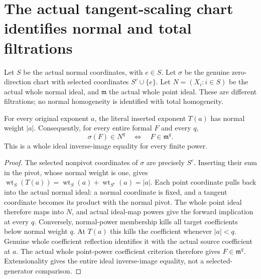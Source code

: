 \section{The actual tangent-scaling chart identifies normal and total filtrations}

Let $S$ be the actual normal coordinates, with $e\in S$. Let $\sigma$ be
the genuine zero-direction chart with selected coordinates $S^c\cup\{e\}$.
Let $N=(X_i:i\in S)$ be the actual whole normal ideal, and $\mathfrak m$
the actual whole point ideal. These are different filtrations; no normal
homogeneity is identified with total homogeneity.

\begin{theorem}
\label{hir:actual-tangent-scaling-formal-filtration}
\leanok
For every original exponent $a$, the literal inserted exponent $T(a)$ has
normal weight $|a|$. Consequently, for every entire formal $F$ and every $q$,
\[
 \sigma(F)\in N^q\quad\Longleftrightarrow\quad F\in\mathfrak m^q.
\]
This is a whole ideal inverse-image equality for every finite power.
\end{theorem}
\begin{proof}
The selected nonpivot coordinates of $\sigma$ are precisely $S^c$.
Inserting their sum in the pivot, whose normal weight is one, gives
$\operatorname{wt}_S(T(a))=\operatorname{wt}_S(a)+\operatorname{wt}_{S^c}(a)=|a|$.
Each point coordinate pulls back into the actual normal ideal: a normal
coordinate is fixed, and a tangent coordinate becomes its product with the
normal pivot. The whole point ideal therefore maps into $N$, and actual
ideal-map powers give the forward implication at every $q$.
Conversely, normal-power membership kills all target coefficients below
normal weight $q$. At $T(a)$ this kills the coefficient whenever $|a|<q$.
Genuine whole coefficient reflection identifies it with the actual source
coefficient at $a$. The actual whole point-power coefficient criterion
therefore gives $F\in\mathfrak m^q$. Extensionality gives the entire ideal
inverse-image equality, not a selected-generator comparison.
\end{proof}

